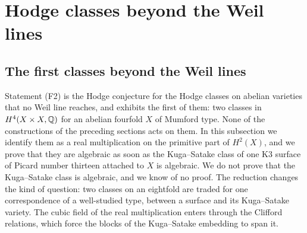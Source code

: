 \section{Hodge classes beyond the Weil lines}\label{sec:beyond}

\subsection{The first classes beyond the Weil lines}\label{ssec:mumford}

Statement (F2) is the Hodge conjecture for the Hodge classes on abelian
varieties that no Weil line reaches, and  exhibits
the first of them: two classes in $H^{4}(X\times X,\mathbb{Q})$ for an abelian
fourfold $X$ of Mumford type. None of the constructions of the preceding
sections acts on them. In this subsection we identify them as a real
multiplication on the primitive part of $H^{2}(X)$, and we prove that they
are algebraic as soon as the Kuga--Satake class of one K3 surface of Picard
number thirteen attached to $X$ is algebraic. We do not prove that the
Kuga--Satake class is algebraic, and we know of no proof. The reduction
changes the kind of question: two classes on an eightfold are traded for one
correspondence of a well-studied type, between a surface and its Kuga--Satake
variety. The cubic field of the real multiplication enters through the
Clifford relations, which force the blocks of the Kuga--Satake embedding to
span it.

